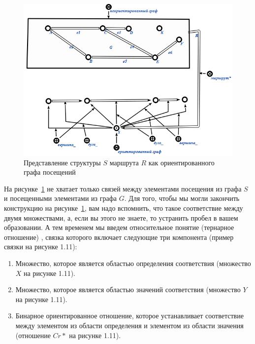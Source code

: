 \begin{figure}
  \centering
  \includegraphics[scale=0.8]{images/2/Route_as_correspondence_Incomplete}
  \caption{Представление структуры $S$ маршрута $R$ как ориентированного графа посещений}
  \label{fig:Route_as_correspondence_Incomplete}
\end{figure}

На рисунке~\ref{fig:Route_as_correspondence_Incomplete} не хватает
только связей между элементами посещения из графа $S$ и посещенными
элементами из графа $G$. Для того, чтобы мы могли закончить
конструкцию на рисунке~\ref{fig:Route_as_correspondence_Incomplete},
вам надо вспомнить, что такое соответствие между двумя множествами, а,
если вы этого не знаете, то устранить пробел в вашем образовании. А
тем временем мы введем относительное понятие (тернарное отношение)
, связка которого включает следующие три
компонента (пример связки на рисунке 1.11):

\begin{enumerate}
\item Множество, которое является областью определения соответствия
  (множество $X$ на рисунке 1.11).
\item Множество, которое является областью значений соответствия
  (множество $Y$ на рисунке 1.11).
\item Бинарное ориентированное отношение, которое устанавливает
  соответствие между элементом из области определения и элементом из
  области значения (отношение $Cr*$ на рисунке 1.11).
\end{enumerate}

